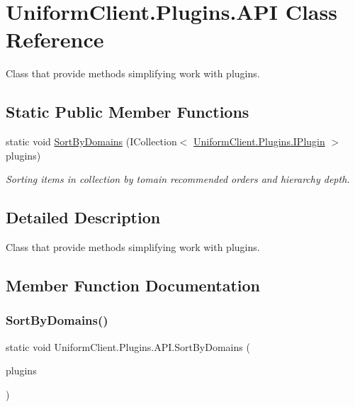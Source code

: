 \hypertarget{class_uniform_client_1_1_plugins_1_1_a_p_i}{}\section{Uniform\+Client.\+Plugins.\+A\+PI Class Reference}
\label{class_uniform_client_1_1_plugins_1_1_a_p_i}


Class that provide methods simplifying work with plugins.  


\subsection*{Static Public Member Functions}
\begin{DoxyCompactItemize}
\item 
static void \mbox{\hyperlink{class_uniform_client_1_1_plugins_1_1_a_p_i_a0f983601b51597ea8ab13f718c58f80c}{Sort\+By\+Domains}} (I\+Collection$<$ \mbox{\hyperlink{interface_uniform_client_1_1_plugins_1_1_i_plugin}{Uniform\+Client.\+Plugins.\+I\+Plugin}} $>$ plugins)
\begin{DoxyCompactList}\small\item\em Sorting items in collection by tomain recommended orders and hierarchy depth. \end{DoxyCompactList}\end{DoxyCompactItemize}


\subsection{Detailed Description}
Class that provide methods simplifying work with plugins. 



\subsection{Member Function Documentation}
\mbox{\label{class_uniform_client_1_1_plugins_1_1_a_p_i_a0f983601b51597ea8ab13f718c58f80c}} 
\subsubsection{\texorpdfstring{Sort\+By\+Domains()}{SortByDomains()}}
{\footnotesize\ttfamily static void Uniform\+Client.\+Plugins.\+A\+P\+I.\+Sort\+By\+Domains (\begin{DoxyParamCaption}\item[{I\+Collection$<$ \mbox{\hyperlink{interface_uniform_client_1_1_plugins_1_1_i_plugin}{Uniform\+Client.\+Plugins.\+I\+Plugin}} $>$}]{plugins }\end{DoxyParamCaption})\hspace{0.3cm}{\ttfamily [static]}}



